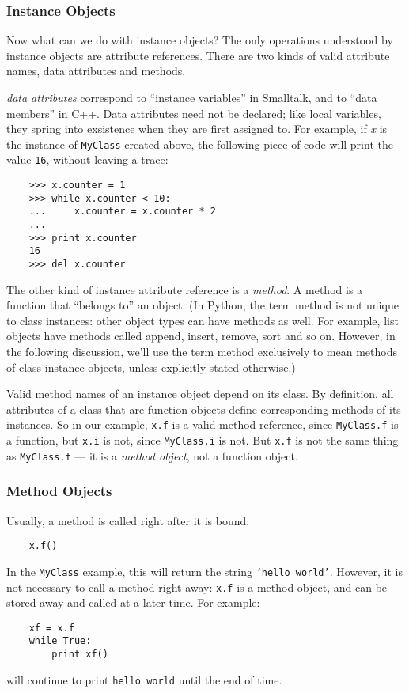 \documentclass[UTF8]{article}
\begin{document}
\subsubsection{Instance Objects}
Now what can we do with instance objects? The only operations understood by instance objects are
attribute references. There are two kinds of valid attribute names, data attributes and methods.

\emph{data attributes} correspond to ``instance variables'' in Smalltalk, and to ``data members''
in C++. Data attributes need not be declared; like local variables, they spring into exsistence
when they are first assigned to. For example, if \emph{x} is the instance of \texttt{MyClass}
created above, the following piece of code will print the value \texttt{16}, without leaving a
trace:
\begin{verbatim}
    >>> x.counter = 1
    >>> while x.counter < 10:
    ...     x.counter = x.counter * 2
    ...
    >>> print x.counter
    16
    >>> del x.counter
\end{verbatim}

The other kind of instance attribute reference is a \emph{method}. A method is a function that
``belongs to'' an object. (In Python, the term method is not unique to class instances: other
object types can have methods as well. For example, list objects have methods called append, insert,
remove, sort and so on. However, in the following discussion, we'll use the term method exclusively
to mean methods of class instance objects, unless explicitly stated otherwise.)

Valid method names of an instance object depend on its class. By definition, all attributes of a
class that are function objects define corresponding methods of its instances. So in our example,
\texttt{x.f} is a valid method reference, since \texttt{MyClass.f} is a function, but \texttt{x.i}
is not, since \texttt{MyClass.i} is not. But \texttt{x.f} is not the same thing as
\texttt{MyClass.f} --- it is a \emph{method object}, not a function object.

\subsubsection{Method Objects}
Usually, a method is called right after it is bound:
\begin{verbatim}
    x.f()
\end{verbatim}

In the \texttt{MyClass} example, this will return the string \texttt{'hello world'}. However, it is
not necessary to call a method right away: \texttt{x.f} is a method object, and can be stored away
and called at a later time. For example:
\begin{verbatim}
    xf = x.f
    while True:
        print xf()
\end{verbatim}
will continue to print \texttt{hello world} until the end of time.
\end{document}
